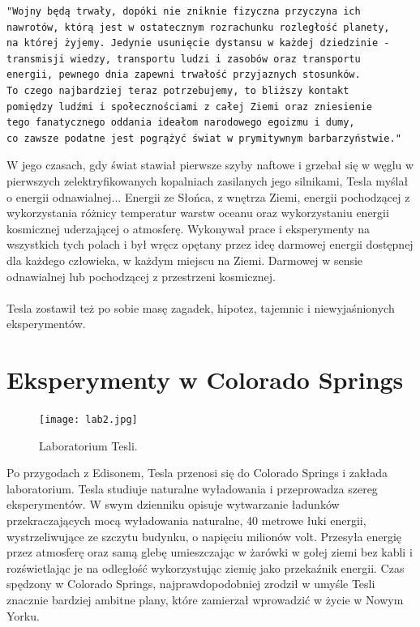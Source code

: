 \documentclass{article}
\begin{document}
\begin{large}
\begin{verbatim}
"Wojny będą trwały, dopóki nie zniknie fizyczna przyczyna ich
nawrotów, którą jest w ostatecznym rozrachunku rozległość planety,
na której żyjemy. Jedynie usunięcie dystansu w każdej dziedzinie -
transmisji wiedzy, transportu ludzi i zasobów oraz transportu
energii, pewnego dnia zapewni trwałość przyjaznych stosunków. 
To czego najbardziej teraz potrzebujemy, to bliższy kontakt 
pomiędzy ludźmi i społecznościami z całej Ziemi oraz zniesienie 
tego fanatycznego oddania ideałom narodowego egoizmu i dumy, 
co zawsze podatne jest pogrążyć świat w prymitywnym barbarzyństwie."

\end{verbatim}

\indent W jego czasach, gdy świat stawiał pierwsze szyby naftowe i grzebał się w węglu w pierwszych zelektryfikowanych kopalniach zasilanych jego silnikami, Tesla myślał o energii odnawialnej... Energii ze Słońca, z wnętrza Ziemi, energii pochodzącej z wykorzystania różnicy temperatur warstw oceanu oraz wykorzystaniu energii kosmicznej uderzającej o atmosferę. Wykonywał prace i eksperymenty na wszystkich tych polach i był wręcz opętany przez ideę darmowej energii dostępnej dla każdego człowieka, w każdym miejscu na Ziemi. Darmowej w sensie odnawialnej lub  pochodzącej z przestrzeni kosmicznej.
\\
\\
Tesla zostawił też po sobie masę zagadek, hipotez, tajemnic i niewyjaśnionych eksperymentów.
\\


\newpage


\section{Eksperymenty w Colorado Springs}


\begin{figure}
\vspace{-15pt}
\texttt{[image: lab2.jpg]}
\vspace{0pt}
\caption{Laboratorium Tesli.}
\vspace{0pt}
\end{figure}

Po przygodach z Edisonem, Tesla przenosi się do Colorado Springs i zakłada laboratorium. Tesla studiuje naturalne wyładowania i przeprowadza szereg eksperymentów. W swym dzienniku opisuje wytwarzanie ładunków przekraczających mocą wyładowania naturalne, 40 metrowe łuki energii, wystrzeliwujące ze szczytu budynku, o napięciu milionów volt. Przesyła energię przez atmosferę oraz samą glebę umieszczając w żarówki w gołej ziemi bez kabli i rozświetlając je na odległość wykorzystując ziemię jako przekaźnik energii. Czas spędzony w Colorado Springs, najprawdopodobniej zrodził w umyśle Tesli znacznie bardziej ambitne plany, które zamierzał wprowadzić w życie w Nowym Yorku.\cite{art:7}
\\



\end{large}
\end{document}

